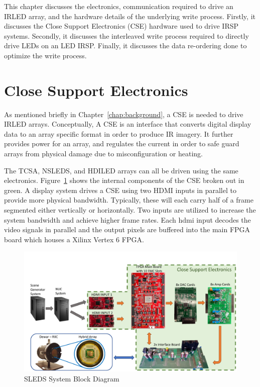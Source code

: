  This chapter discusses the electronics, communication required to drive an IRLED array, and the hardware details of the underlying write process. Firstly, it discusses the Close Support Electronics (CSE) hardware used to drive IRSP systems. Secondly, it discusses the interleaved write process required to directly drive LEDs on an LED IRSP. Finally, it discusses the data re-ordering done to optimize the write process.

\section{Close Support Electronics}
    \label{sec:close_support_electronics}
    As mentioned briefly in Chapter~\ref{chap:background}, a CSE is needed to drive IRLED arrays. Conceptually, A CSE is an interface that converts digital display data to an array specific format in order to produce IR imagery. It further provides power for an array, and regulates the current in order to safe guard arrays from physical damage due to misconfiguration or heating.

    The TCSA, NSLEDS, and HDILED arrays can all be driven using the same electronics. Figure~\ref{fig:sleds_block} shows the internal components of the CSE broken out in green. A display system drives a CSE using two HDMI inputs in parallel to provide more physical bandwidth. Typically, these will each carry half of a frame segmented either vertically or horizontally. Two inputs are utilized to increase the system bandwidth and achieve higher frame rates. Each hdmi input decodes the video signals in parallel and the output pixels are buffered into the main FPGA board which houses a Xilinx Vertex 6 FPGA\cite{XILINX1}.

    \begin{figure}
        \centering
        \includegraphics[width=1.0\textwidth]{fig/sleds_block.pdf}
        \caption{SLEDS System Block Diagram}
        \label{fig:sleds_block}
    \end{figure}


